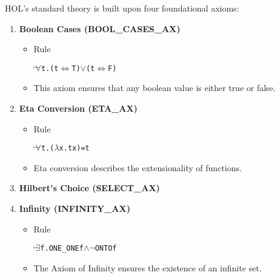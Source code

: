 HOL’s standard theory is built upon four foundational axioms:
\begin{enumerate}
    \item \textbf{Boolean Cases (BOOL\_CASES\_AX)}
    \begin{itemize}
        \item Rule
          \begin{alltt}
            \(\!\!\!{\turn}\!\!\!\!\) \(\forall\)t. (t \({\Leftrightarrow}\) T) \(\lor\) (t \({\Leftrightarrow}\) F)
          \end{alltt}
        \item This axiom ensures that any boolean value is either true or false.
    \end{itemize}

    \item \textbf{Eta Conversion (ETA\_AX)}
    \begin{itemize}
        \item Rule
          \begin{alltt}
            \(\!\!\!{\turn}\!\!\!\!\) \(\forall\)t. (\(\lambda\)x. t x) = t
          \end{alltt}
        \item Eta conversion describes the extensionality of functions.
    \end{itemize}

    \item \textbf{Hilbert’s Choice (SELECT\_AX)}

    \item \textbf{Infinity (INFINITY\_AX)}
    \begin{itemize}
        \item Rule
          \begin{alltt}
            \(\!\!\!{\turn}\!\!\!\!\) \(\exists\)f. ONE_ONE f \(\land\) \(\neg\)ONTO f
          \end{alltt}
        \item The Axiom of Infinity ensures the existence of an infinite set.
    \end{itemize}

\end{enumerate}

